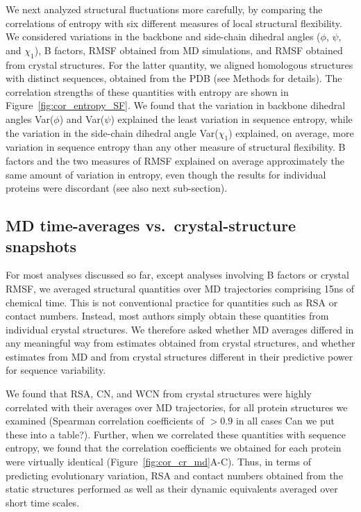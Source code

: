 \documentclass[12pt]{article}
\begin{document}
We next analyzed structural fluctuations more carefully, by comparing the correlations of entropy with six different measures of local structural flexibility.  We considered variations in the backbone and side-chain dihedral angles ($\phi$, $\psi$, and $\chi_1$), B factors, RMSF obtained from MD simulations, and RMSF obtained from crystal structures. For the latter quantity, we aligned homologous structures with distinct sequences, obtained from the PDB (see Methods for details). The correlation strengths of these quantities with entropy are shown in Figure~\ref{fig:cor_entropy_SF}. We found that the variation in backbone dihedral angles Var($\phi$) and Var($\psi$) explained the least variation in sequence entropy, while the variation in the side-chain dihedral angle Var($\chi_1$) explained, on average, more variation in sequence entropy than any other measure of structural flexibility. B factors and the two measures of RMSF explained on average approximately the same amount of variation in entropy, even though the results for individual proteins were discordant (see also next sub-section).

\subsection*{MD time-averages vs.\ crystal-structure snapshots}

For most analyses discussed so far, except analyses involving B factors or crystal RMSF, we averaged structural quantities over MD trajectories comprising 15ns of chemical time. This is not conventional practice for quantities such as RSA or contact numbers. Instead, most authors simply obtain these quantities from individual crystal structures. We therefore asked whether MD averages differed in any meaningful way from estimates obtained from crystal structures, and whether estimates from MD and from crystal structures different in their predictive power for sequence variability.

We found that RSA, CN, and WCN from crystal structures were highly correlated with their averages over MD trajectories, for all protein structures we examined (Spearman correlation coefficients of $>0.9$ in all cases {\color{red}Can we put these into a table?}). Further, when we correlated these quantities with sequence entropy, we found that the correlation coefficients we obtained for each protein were virtually identical (Figure~\ref{fig:cor_cr_md}A-C). Thus, in terms of predicting evolutionary variation, RSA and contact numbers obtained from the static structures performed as well as their dynamic equivalents averaged over short time scales.
\end{document}
